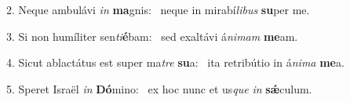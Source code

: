 2. Neque ambulávi \textit{in} \textbf{ma}gnis: \ast\  neque in mirabí\textit{li}\textit{bus} \textbf{su}per me.\

3. Si non humíliter sen\textit{ti}\textbf{é}bam: \ast\  sed exaltávi á\textit{ni}\textit{mam} \textbf{me}am.\

4. Sicut ablactátus est super ma\textit{tre} \textbf{su}a: \ast\  ita retribútio in á\textit{ni}\textit{ma} \textbf{me}a.\

5. Speret Israël \textit{in} \textbf{Dó}mino: \ast\  ex hoc nunc et us\textit{que} \textit{in} \textbf{sǽ}culum.\


